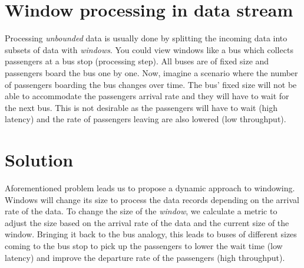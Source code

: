 \section*{Window processing in data stream}

Processing \emph{unbounded} data is usually done by splitting the 
incoming data into subsets of data with \emph{windows}. You could view
windows like a bus which collects passengers at a 
bus stop (processing step). All buses are of fixed size and passengers board
the bus one by one. Now, imagine a scenario where the number of passengers
boarding the bus changes over time. The bus' fixed size will not be able 
to accommodate the passengers arrival rate and they will have to wait for the
next bus. This is not desirable as the passengers will have 
to wait (high latency) 
and the rate of passengers leaving are also lowered (low throughput).


\section*{Solution}
Aforementioned problem leads us to propose a dynamic approach 
to windowing. Windows will change its size to process the data 
records depending on the arrival rate of the data. 
To change the size of the \emph{window}, we calculate a metric 
to adjust the size based on the arrival rate of the data and the 
current size of the window. Bringing it back to the bus analogy, 
this leads to buses of different sizes coming to the bus stop to 
pick up the passengers to lower the wait time (low latency) and 
improve the departure rate of the passengers (high throughput). 
